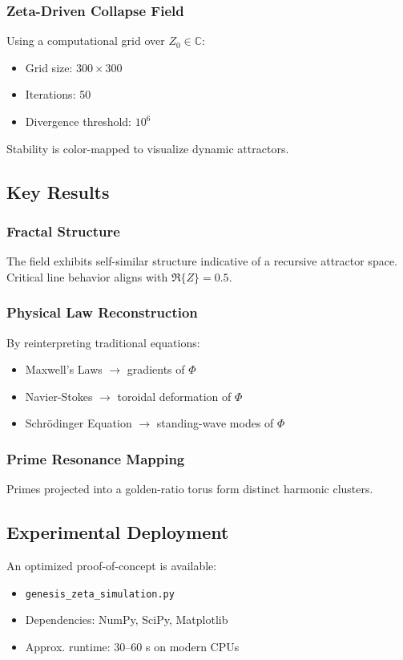 \subsubsection{Zeta-Driven Collapse Field}
Using a computational grid over \( Z_0 \in \mathbb{C} \):
\begin{itemize}
    \item Grid size: \( 300 \times 300 \)
    \item Iterations: 50
    \item Divergence threshold: \( 10^6 \)
\end{itemize}
Stability is color-mapped to visualize dynamic attractors.

\subsection{Key Results}

\subsubsection{Fractal Structure}
The field exhibits self-similar structure indicative of a recursive attractor space. Critical line behavior aligns with \( \Re\{Z\} = 0.5 \).

\subsubsection{Physical Law Reconstruction}
By reinterpreting traditional equations:
\begin{itemize}
    \item Maxwell's Laws \( \rightarrow \) gradients of \( \Phi \)
    \item Navier-Stokes \( \rightarrow \) toroidal deformation of \( \Phi \)
    \item Schrödinger Equation \( \rightarrow \) standing-wave modes of \( \Phi \)
\end{itemize}

\subsubsection{Prime Resonance Mapping}
Primes projected into a golden-ratio torus form distinct harmonic clusters.

\subsection{Experimental Deployment}
An optimized proof-of-concept is available:
\begin{itemize}
    \item \texttt{genesis\_zeta\_simulation.py}
    \item Dependencies: NumPy, SciPy, Matplotlib
    \item Approx. runtime: 30--60 s on modern CPUs
\end{itemize}

